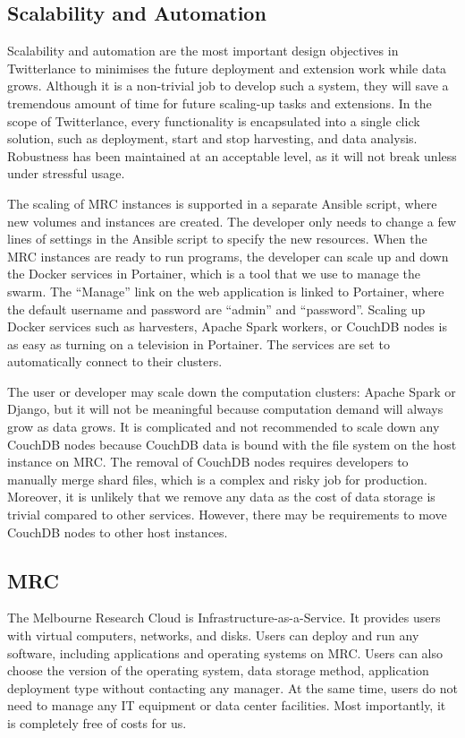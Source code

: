 \subsection{Scalability and Automation}

Scalability and automation are the most important design objectives in Twitterlance to minimises the future deployment and extension work while data grows. Although it is a non-trivial job to develop such a system, they will save a tremendous amount of time for future scaling-up tasks and extensions. In the scope of  Twitterlance, every functionality is encapsulated into a single click solution, such as deployment, start and stop harvesting, and data analysis. Robustness has been maintained at an acceptable level, as it will not break unless under stressful usage. 

The scaling of MRC instances is supported in a separate Ansible script, where new volumes and instances are created. The developer only needs to change a few lines of settings in the Ansible script to specify the new resources. When the MRC instances are ready to run programs, the developer can scale up and down the Docker services in Portainer, which is a tool that we use to manage the swarm. The “Manage” link on the web application is linked to Portainer, where the default username and password are “admin” and “password”. Scaling up Docker services such as harvesters, Apache Spark workers, or CouchDB nodes is as easy as turning on a television in Portainer. The services are set to automatically connect to their clusters.

The user or developer may scale down the computation clusters: Apache Spark or Django, but it will not be meaningful because computation demand will always grow as data grows. It is complicated and not recommended to scale down any CouchDB nodes because CouchDB data is bound with the file system on the host instance on MRC. The removal of CouchDB nodes requires developers to manually merge shard files, which is a complex and risky job for production. Moreover, it is unlikely that we remove any data as the cost of data storage is trivial compared to other services. However, there may be requirements to move CouchDB nodes to other host instances.

\subsection{MRC}
The Melbourne Research Cloud is Infrastructure-as-a-Service. It provides users with virtual computers, networks, and disks. Users can deploy and run any software, including applications and operating systems on MRC. Users can also choose the version of the operating system, data storage method, application deployment type without contacting any manager. At the same time, users do not need to manage any IT equipment or data center facilities. Most importantly, it is completely free of costs for us. 

